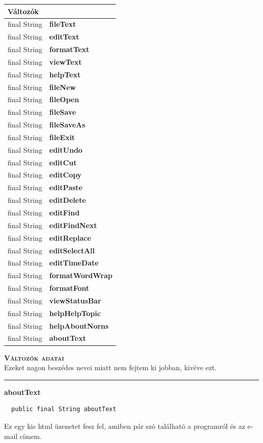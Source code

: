 \documentclass[12pt]{article}
\begin{document}
\begin{longtable}{|p{5cm}|p{10cm}|} \hline
    \multicolumn{2}{|p{15cm}|}{\textbf{Változók}}  \\ \hline
    final String & \textbf{fileText} \\ \hline
    final String & \textbf{editText} \\ \hline
    final String & \textbf{formatText} \\ \hline
    final String & \textbf{viewText} \\ \hline
    final String & \textbf{helpText} \\ \hline
    final String & \textbf{fileNew} \\ \hline
    final String & \textbf{fileOpen} \\ \hline
    final String & \textbf{fileSave} \\ \hline
    final String & \textbf{fileSaveAs} \\ \hline
    final String & \textbf{fileExit} \\ \hline
    final String & \textbf{editUndo} \\ \hline
    final String & \textbf{editCut} \\ \hline
    final String & \textbf{editCopy} \\ \hline
    final String & \textbf{editPaste} \\ \hline
    final String & \textbf{editDelete} \\ \hline
    final String & \textbf{editFind} \\ \hline
    final String & \textbf{editFindNext} \\ \hline
    final String & \textbf{editReplace} \\ \hline
    final String & \textbf{editSelectAll} \\ \hline
    final String & \textbf{editTimeDate} \\ \hline
    final String & \textbf{formatWordWrap} \\ \hline
    final String & \textbf{formatFont} \\ \hline
    final String & \textbf{viewStatusBar} \\ \hline
    final String & \textbf{helpHelpTopic} \\ \hline
    final String & \textbf{helpAboutNorns} \\ \hline
    final String & \textbf{aboutText} \\ \hline
\end{longtable}
\textbf{\textsc{Változók adatai}} \\
Ezeket nagon beszédes nevei miatt nem fejtem ki jobban, kivéve ezt.\\
\noindent\rule{\textwidth}{1pt}
\textbf{aboutText}
\begin{lstlisting}
  public final String aboutText
\end{lstlisting}
Ez egy kis html üzenetet fesz fel, amiben pár szó található a programról és
az e-mail címem.
\end{document}
